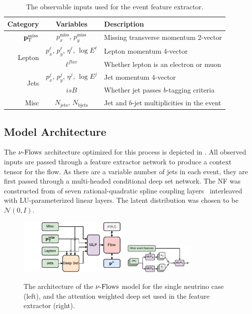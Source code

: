 \begin{table}[ht]
    \caption{The observable inputs used for the event feature extractor.}
    \label{tab:inputs}
    \centering
    \begin{tabular}{r c l}
    \toprule
    Category & Variables & Description\\
    \midrule
    $\mathbf{p}_{\text{T}}^{\text{miss}}$ & $p_x^\text{miss}$, $p_y^\text{miss}$ & Missing transverse momentum 2-vector \\ [2ex]
    \multirow{2}{*}{Lepton} & $p_x^{\ell}$, $p_y^{\ell}$, $\eta^\ell$, $\log E^\ell$ & Lepton momentum 4-vector \\
    & $\ell^{flav}$ &  Whether lepton is an electron or muon \\ [2ex]
    \multirow{2}{*}{Jets} & $p_x^{j}$, $p_y^j$, $\eta^j$,  $\log E^j$ & Jet momentum 4-vector \\
    & $isB$ &  Whether jet passes $b$-tagging criteria \\ [2ex]
    Misc & $N_{\text{jets}}$, $N_{\text{bjets}}$ & Jet and $b$-jet multiplicities in the event\\
    \bottomrule
    \end{tabular}
\end{table}

\subsection{Model Architecture}

The $\mbox{$\nu$-Flows}$ architecture optimized for this process is depicted in .
All observed inputs are passed through a feature extractor network to produce a context tensor for the flow.
As there are a variable number of jets in each event, they are first passed through a multi-headed conditional deep set network.
The NF was constructed from of seven rational-quadratic spline coupling layers~\cite{NeuralSplineFlows} interleaved with LU-parameterized linear layers.
The latent distribution was chosen to be $\mathcal{N}(0, I)$.

\begin{figure}[ht]
    \centering
    \includegraphics[width=0.49\textwidth]{Figures/neutrino_unfolding/nuflow.pdf}
    \includegraphics[width=0.3\textwidth]{Figures/neutrino_unfolding/deepset.pdf}
    \caption{The architecture of the $\mbox{$\nu$-Flows}$ model for the single neutrino case (left), and the attention weighted deep set used in the feature extractor (right).}
    \label{fig:flow}
\end{figure}

